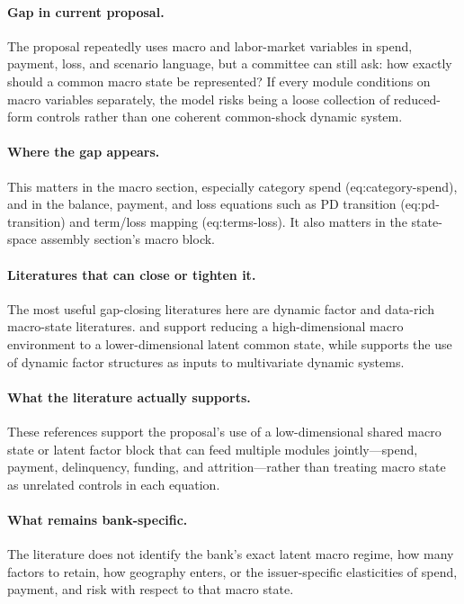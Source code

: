 \documentclass[11pt]{article}
\begin{document}
\paragraph{Gap in current proposal.}
The proposal repeatedly uses macro and labor-market variables in spend, payment,
loss, and scenario language, but a committee can still ask: how exactly should a
common macro state be represented? If every module conditions on macro
variables separately, the model risks being a loose collection of reduced-form
controls rather than one coherent common-shock dynamic system.

\paragraph{Where the gap appears.}
This matters in the macro section, especially category spend
(eq:category-spend), and in the balance, payment, and loss equations such as PD
transition (eq:pd-transition) and term/loss mapping (eq:terms-loss). It also
matters in the state-space assembly section's macro block.

\paragraph{Literatures that can close or tighten it.}
The most useful gap-closing literatures here are dynamic factor and data-rich
macro-state literatures. \citet{bernankeboivineliasz2005favar} and
\citet{bernankeboivin2003datarich} support reducing a high-dimensional macro
environment to a lower-dimensional latent common state, while
\citet{stockwatson2005factorvar} supports the use of dynamic factor structures
as inputs to multivariate dynamic systems.

\paragraph{What the literature actually supports.}
These references support the proposal's use of a low-dimensional shared macro
state or latent factor block that can feed multiple modules jointly---spend,
payment, delinquency, funding, and attrition---rather than treating macro state
as unrelated controls in each equation.

\paragraph{What remains bank-specific.}
The literature does not identify the bank's exact latent macro regime, how many
factors to retain, how geography enters, or the issuer-specific elasticities of
spend, payment, and risk with respect to that macro state.
\end{document}
